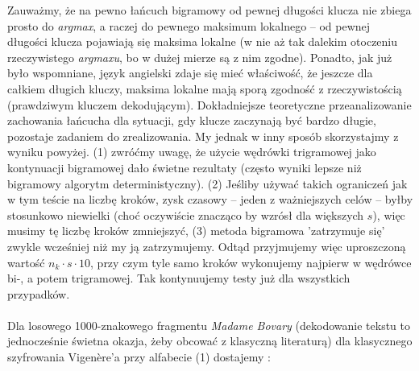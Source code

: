 \documentclass[a4paper]{article}
\theoremstyle{defn}
\theoremstyle{theorem}
\theoremstyle{lemma}
\theoremstyle{cor}
\theoremstyle{fact}
\begin{document}
Zauważmy, że na pewno łańcuch bigramowy od pewnej długości klucza nie zbiega prosto do \textit{argmax}, a raczej do pewnego maksimum lokalnego –  od pewnej długości klucza pojawiają się maksima lokalne (w nie aż tak dalekim otoczeniu rzeczywistego \textit{argmaxu}, bo w dużej mierze są z nim zgodne). Ponadto, jak już było wspomniane, język angielski zdaje się mieć właściwość, że jeszcze dla całkiem długich kluczy, maksima lokalne mają sporą zgodność z rzeczywistością (prawdziwym kluczem dekodującym). Dokładniejsze teoretyczne przeanalizowanie zachowania łańcucha dla sytuacji, gdy klucze zaczynają być bardzo długie, pozostaje zadaniem do zrealizowania. My jednak w inny sposób skorzystajmy z wyniku powyżej. (1) zwróćmy uwagę, że użycie wędrówki trigramowej jako kontynuacji bigramowej dało świetne rezultaty (często wyniki lepsze niż bigramowy algorytm deterministyczny). (2) Jeśliby używać takich ograniczeń jak w tym teście na liczbę kroków, zysk czasowy – jeden z ważniejszych celów – byłby stosunkowo niewielki (choć oczywiście znacząco by wzrósł dla większych $s$), więc musimy tę liczbę kroków zmniejszyć, (3) metoda bigramowa 'zatrzymuje się' zwykle wcześniej niż my ją zatrzymujemy. Odtąd przyjmujemy więc uproszczoną wartość $n_k \cdot s \cdot 10$, przy czym tyle samo kroków wykonujemy najpierw w wędrówce bi-, a potem trigramowej. Tak kontynuujemy testy już dla wszystkich przypadków.\\\\
Dla losowego 1000-znakowego fragmentu \textit{Madame Bovary} (dekodowanie tekstu to jednocześnie świetna okazja, żeby obcować z klasyczną literaturą) dla klasycznego szyfrowania Vigenère'a przy alfabecie (1) dostajemy :\\
\end{document}
